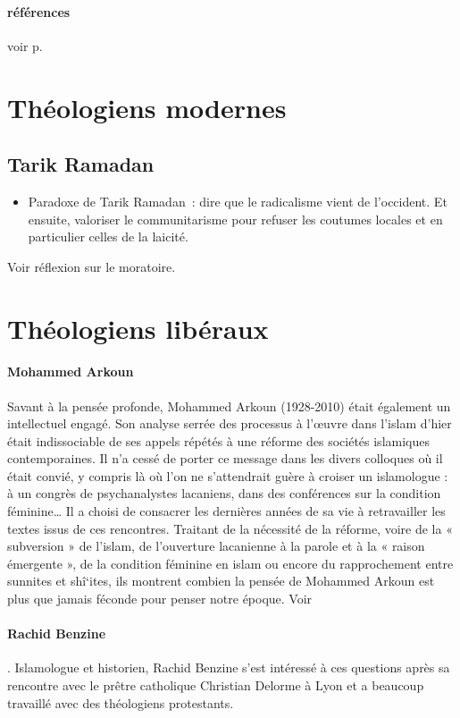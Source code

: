 \paragraph{références}
voir p. 

\section{Théologiens modernes}
\subsection{Tarik Ramadan}
 \begin{itemize}
  \item Paradoxe de Tarik Ramadan~: dire que le radicalisme vient de
    l'occident. Et ensuite, valoriser le communitarisme pour refuser les
    coutumes locales et en particulier celles de la laicité.
  \end{itemize}
  
Voir réflexion sur le moratoire.
  
\section{Théologiens libéraux}

\paragraph{Mohammed Arkoun}
Savant à la pensée profonde, Mohammed Arkoun (1928-2010) était également un intellectuel engagé. Son analyse serrée des processus à l’œuvre dans l’islam d’hier était indissociable de ses appels répétés à une réforme des sociétés islamiques contemporaines. Il n’a cessé de porter ce message dans les divers colloques où il était convié, y compris là où l’on ne s’attendrait guère à croiser un islamologue : à un congrès de psychanalystes lacaniens, dans des conférences sur la condition féminine…
Il a choisi de consacrer les dernières années de sa vie à retravailler les textes issus de ces rencontres. Traitant de la nécessité de la réforme, voire de la « subversion » de l’islam, de l’ouverture lacanienne à la parole et à la « raison émergente », de la condition féminine en islam ou encore du rapprochement entre sunnites et shî‘ites, ils montrent combien la pensée de Mohammed Arkoun est plus que jamais féconde pour penser notre époque.
Voir   
\label{theol:Arkoun3}

\paragraph{Rachid Benzine}.
Islamologue et historien, Rachid Benzine s’est intéressé à ces questions après sa rencontre avec le prêtre catholique Christian Delorme à Lyon et a beaucoup travaillé avec des théologiens protestants.



